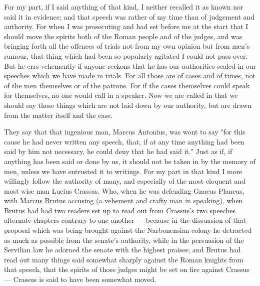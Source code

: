  For my part, if I said anything of that kind, I neither recalled it as known nor said it in evidence; and that speech was rather of my time than of judgement and authority. For when I was prosecuting and had set before me at the start that I should move the spirits both of the Roman people and of the judges, and was bringing forth all the offences of trials not from my own opinion but from men's rumour, that thing which had been so popularly agitated I could not pass over. But he errs vehemently if anyone reckons that he has our authorities sealed in our speeches which we have made in trials. For all those are of cases and of times, not of the men themselves or of the patrons. For if the cases themselves could speak for themselves, no one would call in a speaker. Now we are called in that we should say those things which are not laid down by our authority, but are drawn from the matter itself and the case.

 They say that that ingenious man, Marcus Antonius, was wont to say "for this cause he had never written any speech, that, if at any time anything had been said by him not necessary, he could deny that he had said it." Just as if, if anything has been said or done by us, it should not be taken in by the memory of men, unless we have entrusted it to writings. For my part in that kind I more willingly follow the authority of many, and especially of the most eloquent and most wise man Lucius Crassus. Who, when he was defending Gnaeus Plancus, with Marcus Brutus accusing (a vehement and crafty man in speaking), when Brutus had had two readers set up to read out from Crassus's two speeches alternate chapters contrary to one another --- because in the dissuasion of that proposal which was being brought against the Narbonensian colony he detracted as much as possible from the senate's authority, while in the persuasion of the Servilian law he adorned the senate with the highest praises; and Brutus had read out many things said somewhat sharply against the Roman knights from that speech, that the spirits of those judges might be set on fire against Crassus --- Crassus is said to have been somewhat moved.

